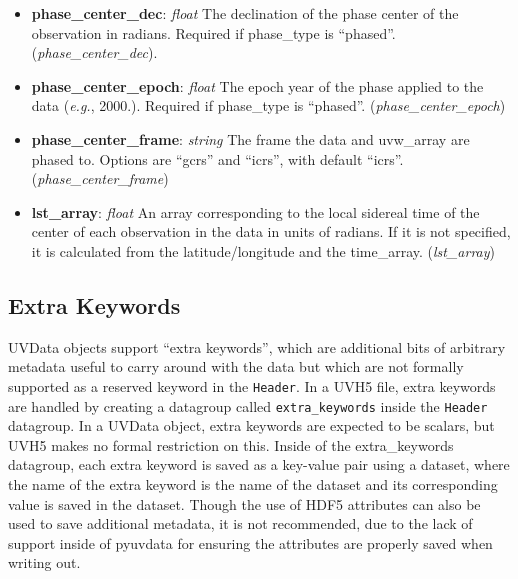 \documentclass[11pt, oneside]{article}
\begin{document}
\begin{itemize}
\item \textbf{phase\_center\_dec}: \textit{float} The declination of the phase
  center of the observation in radians. Required if phase\_type is
  ``phased''. (\textit{phase\_center\_dec}).
\item \textbf{phase\_center\_epoch}: \textit{float} The epoch year of the phase
  applied to the data (\textit{e.g.}, 2000.). Required if phase\_type is
  ``phased''. (\textit{phase\_center\_epoch})
\item \textbf{phase\_center\_frame}: \textit{string} The frame the data and
  uvw\_array are phased to. Options are ``gcrs'' and ``icrs'', with default
  ``icrs''. (\textit{phase\_center\_frame})
\item \textbf{lst\_array}: \textit{float} An array corresponding to the local
  sidereal time of the center of each observation in the data in units of
  radians. If it is not specified, it is calculated from the latitude/longitude
  and the time\_array. (\textit{lst\_array})
\end{itemize}

\subsection{Extra Keywords}
\label{sec:extra_keywords}
UVData objects support ``extra keywords'', which are additional bits of
arbitrary metadata useful to carry around with the data but which are not
formally supported as a reserved keyword in the \verb+Header+. In a UVH5 file,
extra keywords are handled by creating a datagroup called \verb+extra_keywords+
inside the \verb+Header+ datagroup. In a UVData object, extra keywords are
expected to be scalars, but UVH5 makes no formal restriction on this. Inside of
the extra\_keywords datagroup, each extra keyword is saved as a key-value pair
using a dataset, where the name of the extra keyword is the name of the dataset
and its corresponding value is saved in the dataset. Though the use of HDF5
attributes can also be used to save additional metadata, it is not recommended,
due to the lack of support inside of pyuvdata for ensuring the attributes are
properly saved when writing out.
\end{document}
